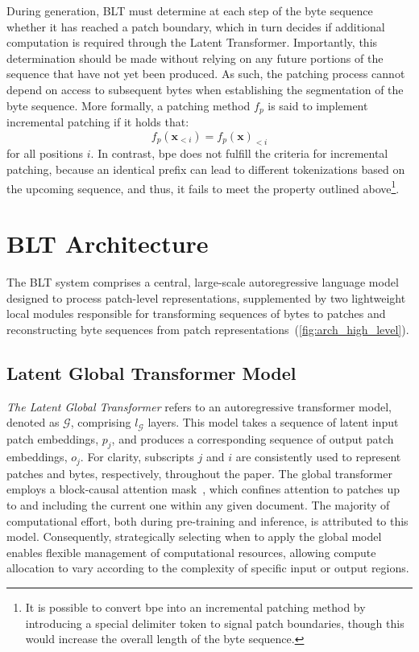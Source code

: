 During generation, {\textsc BLT} must determine at each step of the byte sequence whether it has reached a patch boundary, which in turn decides if additional computation is required through the Latent Transformer. Importantly, this determination should be made without relying on any future portions of the sequence that have not yet been produced. As such, the patching process cannot depend on access to subsequent bytes when establishing the segmentation of the byte sequence. More formally, a patching method $f_p$ is said to implement incremental patching if it holds that:
$$f_p(\pmb{x}_{<i}) = f_p(\pmb{x})_{<i}$$
for all positions $i$. In contrast, bpe does not fulfill the criteria for incremental patching, because an identical prefix can lead to different tokenizations based on the upcoming sequence, and thus, it fails to meet the property outlined above\footnote{It is possible to convert bpe into an incremental patching method by introducing a special delimiter token to signal patch boundaries, though this would increase the overall length of the byte sequence.}.

\section{{\textsc BLT} Architecture}
\label{section:architecture}
The {\textsc BLT} system comprises a central, large-scale autoregressive language model designed to process patch-level representations, supplemented by two lightweight local modules responsible for transforming sequences of bytes to patches and reconstructing byte sequences from patch representations~(\autoref{fig:arch_high_level}).

\subsection{Latent Global Transformer Model}

\textit{The Latent Global Transformer} refers to an autoregressive transformer model, denoted as $\mathcal{G}$, comprising $l_{\mathcal{G}}$ layers. This model takes a sequence of latent input patch embeddings, $p_j$, and produces a corresponding sequence of output patch embeddings, $o_j$. For clarity, subscripts $j$ and $i$ are consistently used to represent patches and bytes, respectively, throughout the paper. The global transformer employs a block-causal attention mask~\citep{dubey2024llama}, which confines attention to patches up to and including the current one within any given document. The majority of computational effort, both during pre-training and inference, is attributed to this model. Consequently, strategically selecting when to apply the global model enables flexible management of computational resources, allowing compute allocation to vary according to the complexity of specific input or output regions.

